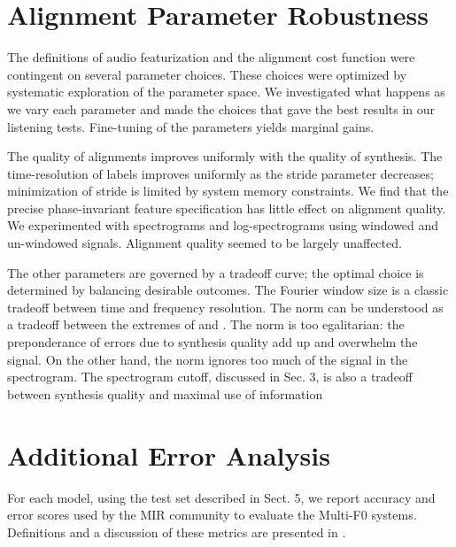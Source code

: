 \documentclass{article} \usepackage{iclr2017_conference,times}
\begin{document}
\fi
 \FloatBarrier

\clearpage

\section{Alignment Parameter Robustness}

The definitions of audio featurization and the alignment cost function were contingent on several parameter choices. These choices were optimized by systematic exploration of the parameter space. We investigated what happens as we vary each parameter and made the choices that gave the best results in our listening tests. Fine-tuning of the parameters yields marginal gains.


The quality of alignments improves uniformly with the quality of synthesis. The time-resolution of labels improves uniformly as the stride parameter decreases; minimization of stride is limited by system memory constraints. We find that the precise phase-invariant feature specification has little effect on alignment quality. We experimented with spectrograms and log-spectrograms using windowed and un-windowed signals. Alignment quality seemed to be largely unaffected.

The other parameters are governed by a tradeoff curve; the optimal choice is determined by balancing desirable outcomes. The Fourier window size is a classic tradeoff between time and frequency resolution. The  norm can be understood as a tradeoff between the extremes of  and . The  norm is too egalitarian: the preponderance of errors due to synthesis quality add up and overwhelm the signal. On the other hand, the  norm ignores too much of the signal in the spectrogram. The spectrogram cutoff, discussed in Sec. 3, is also a tradeoff between synthesis quality and maximal use of information \section{Additional Error Analysis}

For each model, using the test set described in Sect. 5, we report accuracy and error scores used by the MIR community to evaluate the Multi-F0 systems. Definitions and a discussion of these metrics are presented in \cite{poliner2007}.
\end{document}
